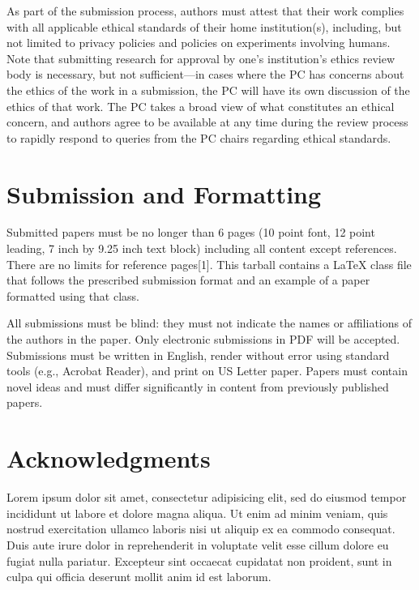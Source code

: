 \documentclass{proposal}
\begin{document}
As part of the submission process, authors must attest that their work complies with all applicable ethical standards of their home institution(s), including, but not limited to privacy policies and policies on experiments involving humans. Note that submitting research for approval by one's institution's ethics review body is necessary, but not sufficient---in cases where the PC has concerns about the ethics of the work in a submission, the PC will have its own discussion of the ethics of that work. The PC takes a broad view of what constitutes an ethical concern, and authors agree to be available at any time during the review process to rapidly respond to queries from the PC chairs regarding ethical standards.

\section{Submission and Formatting}

Submitted papers must be no longer than 6 pages (10 point font, 12 point leading, 7 inch by 9.25 inch text block) including all content except references. There are no limits for reference pages[1]. This tarball contains a LaTeX class file that follows the prescribed submission format and an example of a paper formatted using that class.

All submissions must be blind: they must not indicate the names or affiliations of the authors in the paper. Only electronic submissions in PDF will be accepted. Submissions must be written in English, render without error using standard tools (e.g., Acrobat Reader), and print on US Letter paper. Papers must contain novel ideas and must differ significantly in content from previously published papers.

\section*{Acknowledgments}

Lorem ipsum dolor sit amet, consectetur adipisicing elit, sed do eiusmod tempor incididunt ut labore et dolore magna aliqua. Ut enim ad minim veniam, quis nostrud exercitation ullamco laboris nisi ut aliquip ex ea commodo consequat. Duis aute irure dolor in reprehenderit in voluptate velit esse cillum dolore eu fugiat nulla pariatur. Excepteur sint occaecat cupidatat non proident, sunt in culpa qui officia deserunt mollit anim id est laborum.

 
\begin{small}

\end{small}
\end{document}
